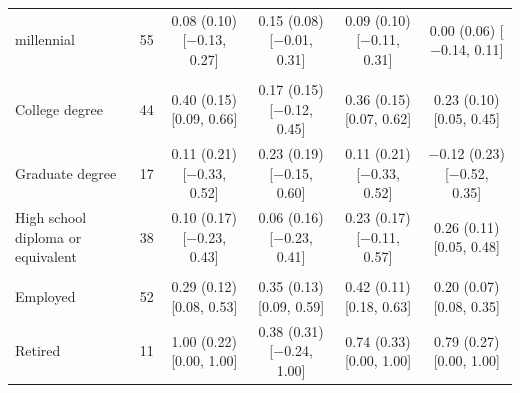 \begin{table}[t]
\begin{tabular}{@{}lr*{4}{c}@{}}
\quad millennial & 55 & \makecell{0.08 (0.10)\\ {[}$-$0.13, 0.27{]}} & \makecell{0.15 (0.08)\\ {[}$-$0.01, 0.31{]}} & \makecell{0.09 (0.10)\\ {[}$-$0.11, 0.31{]}} & \makecell{0.00 (0.06)\\ {[}$-$0.14, 0.11{]}} \\
\addlinespace
\multicolumn{6}{@{}l}{\textit{Education (N)}} \\
\quad College degree & 44 & \makecell{0.40 (0.15)\\ {[}0.09, 0.66{]}} & \makecell{0.17 (0.15)\\ {[}$-$0.12, 0.45{]}} & \makecell{0.36 (0.15)\\ {[}0.07, 0.62{]}} & \makecell{0.23 (0.10)\\ {[}0.05, 0.45{]}} \\
\quad Graduate degree & 17 & \makecell{0.11 (0.21)\\ {[}$-$0.33, 0.52{]}} & \makecell{0.23 (0.19)\\ {[}$-$0.15, 0.60{]}} & \makecell{0.11 (0.21)\\ {[}$-$0.33, 0.52{]}} & \makecell{$-$0.12 (0.23)\\ {[}$-$0.52, 0.35{]}} \\
\quad High school diploma or equivalent & 38 & \makecell{0.10 (0.17)\\ {[}$-$0.23, 0.43{]}} & \makecell{0.06 (0.16)\\ {[}$-$0.23, 0.41{]}} & \makecell{0.23 (0.17)\\ {[}$-$0.11, 0.57{]}} & \makecell{0.26 (0.11)\\ {[}0.05, 0.48{]}} \\
\addlinespace
\multicolumn{6}{@{}l}{\textit{Occupation (N)}} \\
\quad Employed & 52 & \makecell{0.29 (0.12)\\ {[}0.08, 0.53{]}} & \makecell{0.35 (0.13)\\ {[}0.09, 0.59{]}} & \makecell{0.42 (0.11)\\ {[}0.18, 0.63{]}} & \makecell{0.20 (0.07)\\ {[}0.08, 0.35{]}} \\
\quad Retired & 11 & \makecell{1.00 (0.22)\\ {[}0.00, 1.00{]}} & \makecell{0.38 (0.31)\\ {[}$-$0.24, 1.00{]}} & \makecell{0.74 (0.33)\\ {[}0.00, 1.00{]}} & \makecell{0.79 (0.27)\\ {[}0.00, 1.00{]}} \\

\end{tabular}
\end{table}
